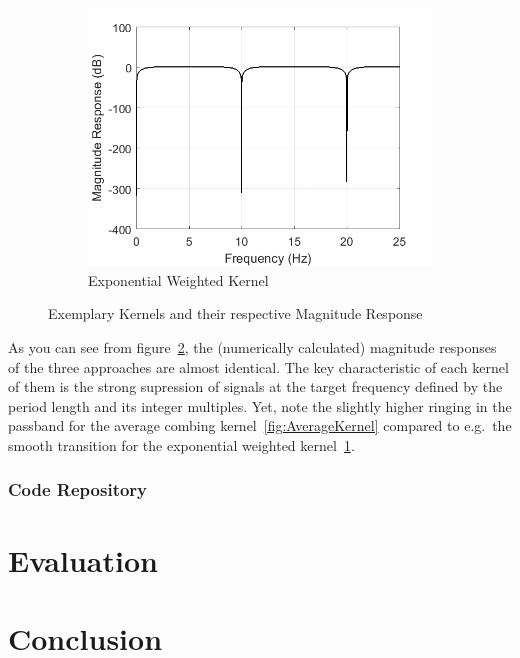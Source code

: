 \documentclass[a4paper]{article}
\begin{document}
\begin{figure}[hbtp]
\begin{subfigure}{.33\textwidth}
    \includegraphics[width=\textwidth]{img/mag_exp.png}
    \caption{Exponential Weighted Kernel}\label{fig:ExponentialKernel}
\end{subfigure}
\caption{Exemplary Kernels and their respective Magnitude Response}\label{fig:ExemplaryKernels}
\end{figure}

As you can see from figure~\ref{fig:ExemplaryKernels}, the (numerically calculated) magnitude responses of the three approaches are almost identical.
The key characteristic of each kernel of them is the strong supression of signals at the target frequency defined by the period length and its integer multiples.
Yet, note the slightly higher ringing in the passband for the average combing kernel~\ref{fig:AverageKernel} compared to e.g.\ the smooth transition for the exponential weighted kernel~\ref{fig:ExponentialKernel}.

\subsubsection{Code Repository}











\section{Evaluation}

\section{Conclusion}




\end{document}
